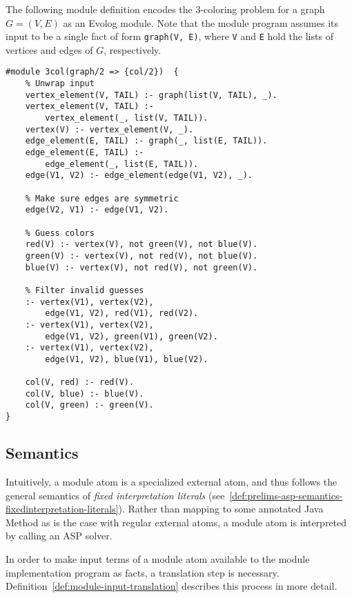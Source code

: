 \begin{example}
\label{ex:3col-module}
The following module definition encodes the 3-coloring problem for a graph $G = (V, E)$ as an Evolog module. Note that the module program assumes its input to be a single fact of form \texttt{graph(V, E)}, where \texttt{V} and \texttt{E} hold the lists of vertices and edges of $G$, respectively.
\begin{lstlisting}[style=asp-code, label={lst:3col-module}]
#module 3col(graph/2 => {col/2})  {
	% Unwrap input
	vertex_element(V, TAIL) :- graph(list(V, TAIL), _).
	vertex_element(V, TAIL) :- 
		vertex_element(_, list(V, TAIL)).
	vertex(V) :- vertex_element(V, _).
	edge_element(E, TAIL) :- graph(_, list(E, TAIL)).
	edge_element(E, TAIL) :- 
		edge_element(_, list(E, TAIL)).
	edge(V1, V2) :- edge_element(edge(V1, V2), _).
	
	% Make sure edges are symmetric
	edge(V2, V1) :- edge(V1, V2).
	
	% Guess colors
	red(V) :- vertex(V), not green(V), not blue(V).
	green(V) :- vertex(V), not red(V), not blue(V).
	blue(V) :- vertex(V), not red(V), not green(V).
	
	% Filter invalid guesses
	:- vertex(V1), vertex(V2), 
		edge(V1, V2), red(V1), red(V2).
	:- vertex(V1), vertex(V2), 
		edge(V1, V2), green(V1), green(V2).
	:- vertex(V1), vertex(V2), 
		edge(V1, V2), blue(V1), blue(V2).
	
	col(V, red) :- red(V).
	col(V, blue) :- blue(V).
	col(V, green) :- green(V).
}	
\end{lstlisting}	
\end{example}	

\subsection{Semantics}
\label{subsec:evolog-modules-semantics}

Intuitively, a module atom is a specialized external atom, and thus follows the general semantics of \emph{fixed interpretation literals} (see~\ref{def:prelims-asp-semantics-fixedinterpretation-literals}). Rather than mapping to some annotated Java Method as is the case with regular external atoms, a module atom is interpreted by calling an ASP solver.

In order to make input terms of a module atom available to the module implementation program as facts, a translation step is necessary. Definition~\ref{def:module-input-translation} describes this process in more detail.

